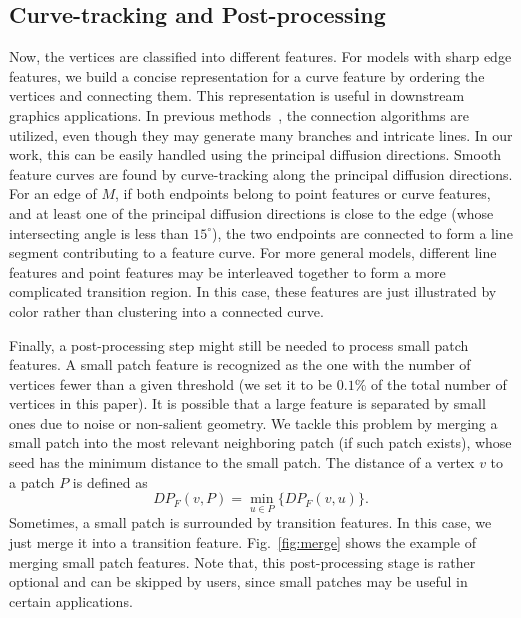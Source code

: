 \documentclass[10pt,journal,cspaper,compsoc]{IEEEtran}
\begin{document}
\subsection{Curve-tracking and Post-processing}
\label{sec:EP}

Now, the vertices are classified into different features. For models
with sharp edge features, we build a concise representation for a
curve feature by ordering the vertices and connecting them. This
representation is useful in downstream graphics applications. In
previous methods~\cite{OBS04,KDTD07}, the connection algorithms are
utilized, even though they may generate many branches and intricate
lines. In our work, this can be easily handled using the principal
diffusion directions. Smooth feature curves are found by
curve-tracking along the principal diffusion directions. For an edge
of $M$, if both endpoints belong to point features or curve features,
and at least one of the principal diffusion directions is close to the
edge (whose intersecting angle is less than $15^\circ$), the two
endpoints are connected to form a line segment contributing to a
feature curve. For more general models, different line features and
point features may be interleaved together to form a more complicated
transition region. In this case, these features are just illustrated
by color rather than clustering into a connected curve.

Finally, a post-processing step might still be needed to process small
patch features. A small patch feature is recognized as the one with
the number of vertices fewer than a given threshold (we set it to be
$0.1\%$ of the total number of vertices in this paper). It is possible
that a large feature is separated by small ones due to noise or
non-salient geometry. We tackle this problem by merging a small patch
into the most relevant neighboring patch (if such patch exists), whose
seed has the minimum distance to the small patch. The distance of a
vertex $v$ to a patch $P$ is defined as
\begin{equation}
\label{eq:distance_P}
DP_F(v,P)=\min_{u\in P}\{DP_F(v,u)\}.
\end{equation}
Sometimes, a small patch is surrounded by transition features. In this
case, we just merge it into a transition feature. Fig.~\ref{fig:merge}
shows the example of merging small patch features. Note that, this
post-processing stage is rather optional and can be skipped by users,
since small patches may be useful in certain applications.
\end{document}
